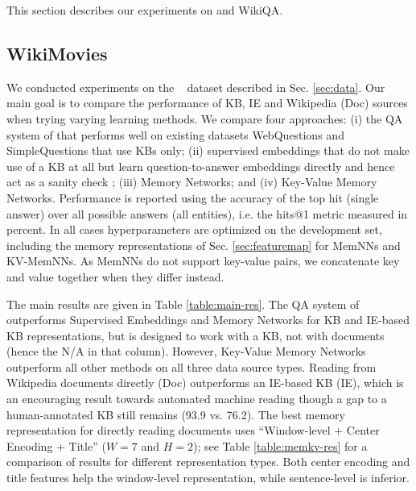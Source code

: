 This section describes our experiments %
 on \WikiMovies and
{\sc WikiQA}.

\subsection{WikiMovies} \label{sec:WikiMovies}

We conducted experiments on the \WikiMovies~ dataset described
in Sec. \ref{sec:data}. Our main goal is to
compare the performance of KB, IE and Wikipedia (Doc) sources when
trying varying learning methods.
We compare four approaches:
(i) the QA system of
\cite{bordes2014question} that performs well on existing datasets
WebQuestions \citep{berant2013semantic} and SimpleQuestions \citep{bordes2015large} that use KBs only; %
(ii) supervised embeddings that do not make use of a KB at all
but learn question-to-answer embeddings directly
and hence act as a sanity check \citep{dodge2015evaluating};
(iii) Memory Networks; and (iv) Key-Value
Memory Networks.
Performance is reported using the accuracy of the top hit (single answer)
over all possible answers (all entities), i.e. the hits@1 metric measured in percent.
In all cases hyperparameters are optimized on the development set, including
the memory representations of Sec. \ref{sec:featuremap} for MemNNs and KV-MemNNs.
As MemNNs do not support key-value pairs, we concatenate key and value together
when they differ instead.
%


The main results are given in Table \ref{table:main-res}.
The  QA system of \cite{bordes2014question} outperforms Supervised Embeddings
and Memory Networks for KB and IE-based KB representations, but is designed
to work with a KB, not with documents (hence the N/A in that column).
However, Key-Value Memory Networks outperform all other methods
on all three data source types.
Reading from Wikipedia documents directly (Doc) outperforms an IE-based KB (IE),
which is an encouraging result towards automated machine reading though a
gap to a human-annotated KB still remains (93.9 vs. 76.2).
The best memory representation for directly reading
documents uses ``Window-level + Center Encoding + Title''
($W=7$ and $H=2$);
see Table \ref{table:memkv-res} for a comparison of results for different
representation types.
Both center encoding and title features help the window-level representation, while
sentence-level is inferior.

